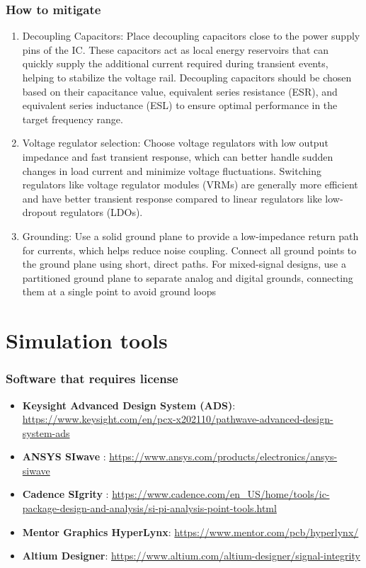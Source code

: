 \documentclass[10pt,hyperref={pdfpagemode=FullScreen},aspectratio=169]{beamer}
\begin{document}
\begin{frame}
  \frametitle{How to mitigate}

\begin{enumerate}
  \item Decoupling Capacitors:
  Place decoupling capacitors close to the power supply pins of the IC. These capacitors act as local energy reservoirs that can quickly supply the additional current required during transient events, helping to stabilize the voltage rail. Decoupling capacitors should be chosen based on their capacitance value, equivalent series resistance (ESR), and equivalent series inductance (ESL) to ensure optimal performance in the target frequency range.
  \item Voltage regulator selection:
  Choose voltage regulators with low output impedance and fast transient response, which can better handle sudden changes in load current and minimize voltage fluctuations. Switching regulators like voltage regulator modules (VRMs) are generally more efficient and have better transient response compared to linear regulators like low-dropout regulators (LDOs).
  \item Grounding:
  Use a solid ground plane to provide a low-impedance return path for currents, which helps reduce noise coupling. Connect all ground points to the ground plane using short, direct paths. For mixed-signal designs, use a partitioned ground plane to separate analog and digital grounds, connecting them at a single point to avoid ground loops
\end{enumerate}


\end{frame}

\section{Simulation tools}

\begin{frame}
  \frametitle{Software that requires license}
  \begin{itemize}
    \item \textbf{Keysight Advanced Design System (ADS)}: \url{https://www.keysight.com/en/pcx-x202110/pathwave-advanced-design-system-ads}
    \item \textbf{ANSYS SIwave} : \url{https://www.ansys.com/products/electronics/ansys-siwave}
    \item \textbf{Cadence SIgrity} : \url{ https://www.cadence.com/en_US/home/tools/ic-package-design-and-analysis/si-pi-analysis-point-tools.html}
    \item \textbf{Mentor Graphics HyperLynx}: \url{https://www.mentor.com/pcb/hyperlynx/}
    \item \textbf{Altium Designer}: \url{https://www.altium.com/altium-designer/signal-integrity}
    \end{itemize}
  

\end{frame}
\end{document}
